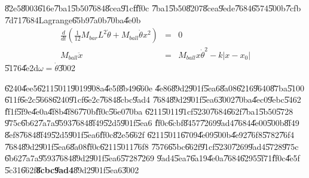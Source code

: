 \U{82e5}\U{8003}\U{616e}\U{7ba1}\U{5b50}\U{7684}\U{8cea}\U{91cf}\U{ff0c}%
\U{7ba1}\U{5b50}\U{8207}\U{8cea}\U{9ede}\U{7684}\U{6574}\U{500b}\U{7cfb}%
\U{7d71}\U{7684}Lagrange\U{65b9}\U{7a0b}\U{70ba}\U{4e0b}%
\begin{eqnarray*}
\frac{d}{dt}\left( \frac{1}{12}M_{bar}L^{2}\dot{\theta}+M_{ball}\dot{\theta}%
x^{2}\right) &=&0 \\
M_{ball}\ddot{x} &=&M_{ball}x\dot{\theta}^{2}-k\left\vert x-x_{0}\right\vert
\end{eqnarray*}%
\U{5176}\U{4e2d}$\omega =\dot{\theta}$\U{3002}

\bigskip

\U{6240}\U{4ee5}\U{6211}\U{5011}\U{9019}\U{908a}\U{4e5f}\U{8b49}\U{660e}%
\U{4e86}\U{89d2}\U{901f}\U{5ea6}\U{8a08}\U{6216}\U{9640}\U{87ba}\U{5100}%
\U{611f}\U{6e2c}\U{5668}\U{6240}\U{91cf}\U{6e2c}\U{7684}\U{8cbc}\U{9ad4}%
\U{7684}\U{89d2}\U{901f}\U{5ea6}\U{3002}\U{70ba}\U{4ec0}\U{9ebc}\U{5462}%
\U{ff1f}\U{5f9e}\U{4e0a}\U{4f8b}\U{4f86}\U{770b}\U{ff0c}\U{56e0}\U{70ba}%
\U{6211}\U{5011}\U{91cf}\U{5230}\U{7684}\U{662f}\U{7ba1}\U{5b50}\U{5728}%
\U{975c}\U{6b62}\U{7a7a}\U{9593}\U{7684}\U{8f49}\U{52d5}\U{901f}\U{5ea6}%
\U{ff0c}\U{6cbf}\U{8457}\U{7269}\U{9ad4}\U{7684}\U{4e00}\U{500b}\U{8f49}%
\U{8ef8}\U{7684}\U{8f49}\U{52d5}\U{901f}\U{5ea6}\U{ff0c}\U{82e5}\U{662f}%
\U{6211}\U{5011}\U{6709}\U{4e09}\U{500b}\U{4e92}\U{76f8}\U{5782}\U{76f4}%
\U{7684}\U{89d2}\U{901f}\U{5ea6}\U{8a08}\U{ff0c}\U{6211}\U{5011}\U{76f8}%
\U{7576}\U{65bc}\U{662f}\U{91cf}\U{5230}\U{7269}\U{9ad4}\U{5728}\U{975c}%
\U{6b62}\U{7a7a}\U{9593}\U{7684}\U{89d2}\U{901f}\U{5ea6}\U{5728}\U{7269}%
\U{9ad4}\U{5ea7}\U{6a19}\U{4e0a}\U{7684}\U{6295}\U{5f71}\U{ff0c}\U{4e5f}%
\U{5c31}\U{662f}\textbf{\U{8cbc}\U{9ad4}}\U{89d2}\U{901f}\U{5ea6}\U{3002}%
\bigskip

